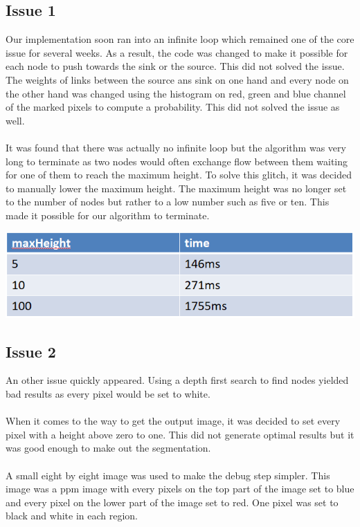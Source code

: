 \documentclass{article}
\begin{document}
\subsection{Issue 1}

Our implementation soon ran into an infinite loop which remained one of the core issue for several weeks. As a result, the code was changed to make it possible for each node to push towards the sink or the source. This did not solved the issue. The weights of links between the source ans sink on one hand and every node on the other hand was changed using the histogram on red, green and blue channel of the marked pixels to compute a probability. This did not solved the issue as well.\\
\\
It was found that there was actually no infinite loop but the algorithm was very long to terminate as two nodes would often exchange flow between them waiting for one of them to reach the maximum height. To solve this glitch, it was decided to manually lower the maximum height. The maximum height was no longer set to the number of nodes but rather to a low number such as five or ten. This made it possible for our algorithm to terminate.

\begin{center}
\includegraphics[scale=0.6]{pics/maxHeight benchmark.PNG} 
\end{center}

\subsection{Issue 2}

An other issue quickly appeared. Using a depth first search to find nodes yielded bad results as every pixel would be set to white.\\
\\
When it comes to the way to get the output image, it was decided to set every pixel with a height above zero to one. This did not generate optimal results but it was good enough to make out the segmentation.\\
\\
A small eight by eight image was used to make the debug step simpler. This image was a ppm image with every pixels on the top part of the image set to blue and every pixel on the lower part of the image set to red. One pixel was set to black and white in each region.
\end{document}
